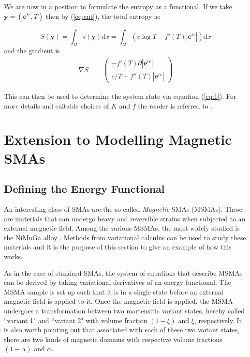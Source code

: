 \begin{multicols}{2}
We are now in a position to formulate the entropy as a functional. If we take $\mathbf{y} = (\mathbf{e}^{tr},  T)$ then by (\ref{eq:ent}), the total entropy is:

\begin{equation} \label{eq:9}
    S(\mathbf{y}) = \int_{\Omega} s(\mathbf{y})\mathrm{d}x = \int_{\Omega}(c\log T - f'( T)|\mathbf{e}^{tr}|)\mathrm{d}x
\end{equation}
and the gradient is
\begin{align} \label{eq:10}
    \nabla S &= 
        \begin{pmatrix}
        -f'(T)\partial |\mathbf{e}^{tr}| \\
        c/T - f''( T)|\mathbf{e}^{tr}|
        \end{pmatrix}
\end{align}

This can then be used to determine the system state via equation (\ref{eq:1}). For more details and suitable choices of $K$ and $f$ the reader is referred to \cite{auricchio2016gradient}. 

\section{Extension to Modelling Magnetic SMAs}

\subsection{Defining the Energy Functional}

An interesting class of SMAs are the so called \textit{Magnetic} SMAs (MSMAs). These are materials that can undergo heavy and reversible strains when subjected to an external magnetic field. Among the various MSMAs, the most widely studied is the NiMnGa alloy \cite{webster1984magnetic, ullakko1996large, tickle1999magnetic}. Methods from variational calculus can be used to study these materials and it is the purpose of this section to give an example of how this works.

As in the case of standard SMAs, the system of equations that describe MSMAs can be derived by taking variational derivatives of an energy functional. The MSMA sample is set up such that it is in a single state before an external magnetic field is applied to it. Once the magnetic field is applied, the MSMA undergoes a transformation between two martensitic variant states, hereby called ``variant 1" and ``variant 2" with volume fraction $(1-\xi)$ and $\xi$, respectively. It is also worth pointing out that associated with each of these two variant states, there are two kinds of magnetic domains with respective volume fractions $(1-\alpha)$ and $\alpha$. 


\end{multicols}
